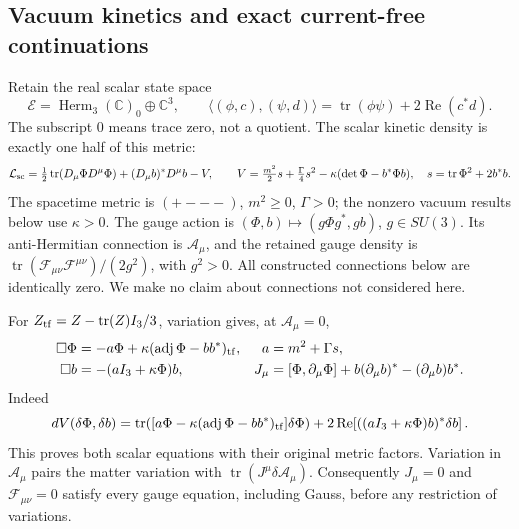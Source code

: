 \subsection{Vacuum kinetics and exact current-free continuations}

Retain the real scalar state space
\[
 \mathcal E=\operatorname{Herm}_3(\mathbb C)_0\oplus\mathbb C^3,
 \qquad
 \langle(\phi,c),(\psi,d)\rangle
 =\operatorname{tr}(\phi\psi)+2\operatorname{Re}(c^*d).
\]
The subscript \(0\) means trace zero, not a quotient. The scalar kinetic
density is exactly one half of this metric:
\[
 \mathcal L_{\rm sc}=\tfrac12\operatorname{tr}
       (D_\mu\Phi D^\mu\Phi)+(D_\mu b)^*D^\mu b-V,\qquad
 V=\tfrac{m^2}{2}s+\tfrac{\Gamma}{4}s^2
                   -\kappa(\det\Phi-b^*\Phi b),\quad
 s=\operatorname{tr}\Phi^2+2b^*b .
\]
The spacetime metric is \((+---)\), \(m^2\geq0\), \(\Gamma>0\);
the nonzero vacuum results below use \(\kappa>0\).
The gauge action is
\((\Phi,b)\mapsto(g\Phi g^*,gb)\), \(g\in SU(3)\).
Its anti-Hermitian connection is \(\mathcal A_\mu\), and the retained
gauge density is
\(\operatorname{tr}(\mathcal F_{\mu\nu}\mathcal F^{\mu\nu})/(2g^2)\),
with \(g^2>0\). All constructed connections below are identically zero.
We make no claim about connections not considered here.

For \(Z_{\rm tf}=Z-\operatorname{tr}(Z)I_3/3\), variation gives, at
\(\mathcal A_\mu=0\),
\begin{align}
 \Box\Phi&=-a\Phi+\kappa(\operatorname{adj}\Phi-bb^*)_{\rm tf},
       &a&=m^2+\Gamma s,\label{q444:vk-pde}\\
 \Box b&=-(aI_3+\kappa\Phi)b,\qquad&
 J_\mu&=[\Phi,\partial_\mu\Phi]
       +b(\partial_\mu b)^*-(\partial_\mu b)b^* .\notag
\end{align}
Indeed
\[
 dV(\delta\Phi,\delta b)
 =\operatorname{tr}\!\left(
 [a\Phi-\kappa(\operatorname{adj}\Phi-bb^*)_{\rm tf}]\delta\Phi\right)
 +2\operatorname{Re}\!\left[
 ((aI_3+\kappa\Phi)b)^*\delta b\right].
\]
This proves both scalar equations with their original metric factors.
Variation in \(\mathcal A_\mu\) pairs the matter variation with
\(\operatorname{tr}(J^\mu\delta\mathcal A_\mu)\).
Consequently \(J_\mu=0\) and \(\mathcal F_{\mu\nu}=0\) satisfy every
gauge equation, including Gauss, before any restriction of variations.

